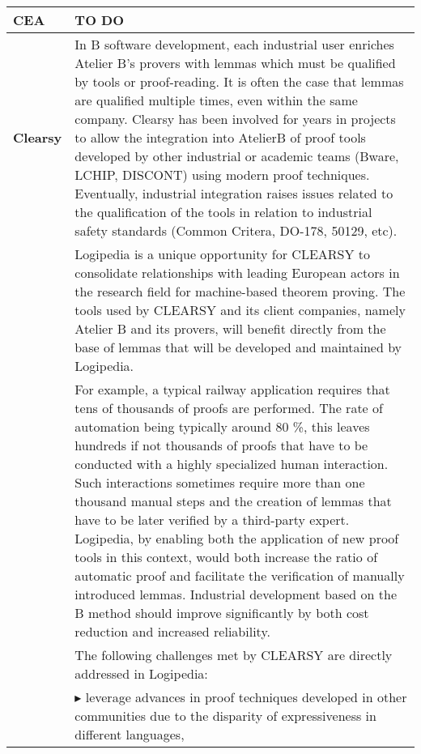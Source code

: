 \begin{longtable}{|p{}|p{}|}
\hline
{\bf CEA}
&
{\color{red} TO DO}
\\
\hline
{\bf Clearsy}
&
In B software development, each
industrial user enriches Atelier B's provers with lemmas which must be
qualified by tools or proof-reading.  It is often the case that lemmas
are qualified multiple times, even within the same company.  Clearsy
has been involved for years in projects to allow the integration into
AtelierB of proof tools developed by other industrial or academic teams
(Bware, LCHIP, DISCONT) using modern proof techniques.  Eventually,
industrial integration raises issues related to the qualification of
the tools in relation to industrial safety standards (Common Critera,
DO-178, 50129, etc).
\\

&
\hspace{0.4cm}
Logipedia is a unique opportunity for CLEARSY to consolidate relationships with leading European actors in the research field for machine-based
theorem proving. The tools used by CLEARSY and its client companies, namely Atelier B and its provers, will benefit directly from the base of lemmas
that will be developed and maintained by Logipedia.
\\

&
\hspace{0.4cm}
For example, a typical railway application requires that tens of thousands of proofs are performed. The rate of automation being typically around 80 \%,
this leaves hundreds if not thousands of proofs that have to be conducted with a highly specialized human interaction. Such interactions sometimes require
more than one thousand manual steps and the creation of lemmas that have to be later verified by a third-party expert.
Logipedia, by enabling both the application of new proof tools in this context, would both increase the ratio of automatic proof and facilitate the verification
of manually introduced lemmas. Industrial development based on the B method should improve significantly by both cost reduction
and increased reliability.
\\

& The following challenges met by CLEARSY are
directly addressed in Logipedia:\\

& $\blacktriangleright$ leverage advances in proof techniques
developed in other communities due to the disparity of expressiveness
in different languages,\\


\end{longtable}
